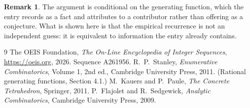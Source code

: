 \documentclass[11pt,a4paper]{article}
\theoremstyle{plain}
\theoremstyle{definition}
\newtheorem{remark}[theorem]{Remark}
\begin{document}
\begin{remark}
The argument is conditional on the generating function, which the entry records as a fact and
attributes to a contributor rather than offering as a conjecture. What is shown here is that
the empirical recurrence is not an independent guess: it is equivalent to information the
entry already contains.
\end{remark}

\begin{thebibliography}{9}
 The OEIS Foundation, \emph{The On-Line Encyclopedia of Integer
Sequences}, \url{https://oeis.org}, 2026. Sequence A261956.
 R.~P.~Stanley, \emph{Enumerative Combinatorics}, Volume 1, 2nd ed.,
Cambridge University Press, 2011. (Rational generating functions, Section 4.1.)
 M.~Kauers and P.~Paule, \emph{The Concrete Tetrahedron}, Springer, 2011.
 P.~Flajolet and R.~Sedgewick, \emph{Analytic Combinatorics}, Cambridge
University Press, 2009.
\end{thebibliography}
\end{document}
